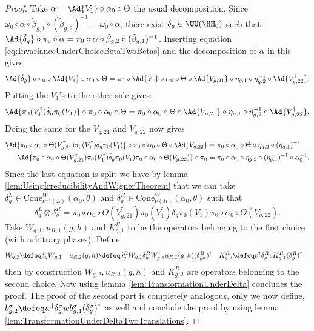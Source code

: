 \begin{proof}
	Take $\alpha=\Ad{V_1}\circ\alpha_{0}\circ\Theta$ the usual decomposition. Since $\omega_0\circ\alpha\circ\tilde{\beta}_{g,1}\circ(\tilde{\beta}_{g,2})^{-1}=\omega_0\circ\alpha$, there exist $\tilde{\delta}_g\in\UU(\HH_0)$ such that: $\Ad{\tilde{\delta}_g}\circ\pi_0\circ\alpha=\pi_0\circ\alpha\circ\tilde{\beta}_{g,2}\circ(\tilde{\beta}_{g,1})^{-1}$. Inserting equation \eqref{eq:InvarianceUnderChoiceBetaTwoBetas} and the decomposition of $\alpha$ in this gives
	\begin{equation}
		\Ad{\tilde{\delta}_g}\circ\pi_0\circ\Ad{V_1}\circ\alpha_0\circ\Theta=\pi_0\circ\Ad{V_1}\circ\alpha_0\circ\Theta\circ\Ad{V_{g,21}}\circ\eta_{g,1}\circ\eta_{g,2}^{-1}\circ\Ad{V_{g,22}^\dagger}.
	\end{equation}
	Putting the $V_1$'s to the other side gives:
	\begin{equation}
		\Ad{\pi_0(V_1^\dagger) \tilde{\delta}_g\pi_0(V_1)}\circ\pi_0\circ\alpha_0\circ\Theta=\pi_0\circ\alpha_0\circ\Theta\circ\Ad{V_{g,21}}\circ\eta_{g,1}\circ\eta_{g,2}^{-1}\circ\Ad{V_{g,22}^\dagger}.
	\end{equation}
	Doing the same for the $V_{g,21}$ and $V_{g,22}$ now gives
	\begin{align}
		\Ad{\pi_0\circ\alpha_0\circ\Theta(V_{g,21}^\dagger)\pi_0(V_1^\dagger)\tilde{\delta}_g\pi_0(V_1)}\circ\pi_0\circ\alpha_0\circ\Theta\circ\Ad{V_{g,22}}&=\pi_0\circ\alpha_0\circ\Theta\circ\eta_{g,2}\circ(\eta_{g,1})^{-1}\\
		\Ad{\pi_0\circ\alpha_0\circ\Theta(V_{g,21}^\dagger)\pi_0(V_1^\dagger)\tilde{\delta}_g\pi_0(V_1)\pi_0\circ\alpha_0\circ\Theta(V_{g,22})}\circ\pi_0&=\pi_0\circ\alpha_0\circ\eta_{g,2}\circ(\eta_{g,1})^{-1}\circ\alpha_0^{-1}.
	\end{align}
	Since the last equation is split we have by lemma \ref{lem:UsingIrreducibilityAndWignerTheorem} that we can take $\delta_g^L\in\textrm{Cone}_{\nu^{-1}(L)}^W(\alpha_0,\theta)$ and $\delta_g^R\in\textrm{Cone}_{\nu(R)}^W(\alpha_0,\theta)$ such that
	\begin{equation}
		\delta_g^L\otimes\delta_g^R=\pi_0\circ\alpha_0\circ\Theta(V_{g,21}^\dagger)\pi_0(V_1^\dagger)\tilde{\delta}_g\pi_0(V_1)\pi_0\circ\alpha_0\circ\Theta(V_{g,22}).
	\end{equation}
	Take $W_{g,1},u_{R,1}(g,h)$ and $K^R_{g,1}$ to be the operators belonging to the first choice (with arbitrary phases). Define
	\begin{align}
		W_{g,2}&\defeq\delta_g W_{g,1}&u_{R,2}(g,h)&\defeq \delta_g^R W_{g,1}\delta_h^R W_{g,1}^\dagger u_{R,1}(g,h)(\delta_{gh}^R)^\dagger&K^R_{g,2}&\defeq v^\dagger \delta_g^R v K_{g,1}^R (\delta_g^R)^\dagger
	\end{align}
	then by construction $W_{g,2},u_{R,2}(g,h)$ and $K^R_{g,2}$ are operators belonging to the second choice. Now using lemma \ref{lem:TransformationUnderDelta} concludes the proof. The proof of the second part is completely analogous, only we now define, $b_{g,2}^\sigma\defeq w^\dagger\delta^\sigma_g w b_{g,1}^\sigma (\delta^\sigma_g)^\dagger$ as well and conclude the proof by using lemma \ref{lem:TransformationUnderDeltaTwoTranslations}.
\end{proof}
